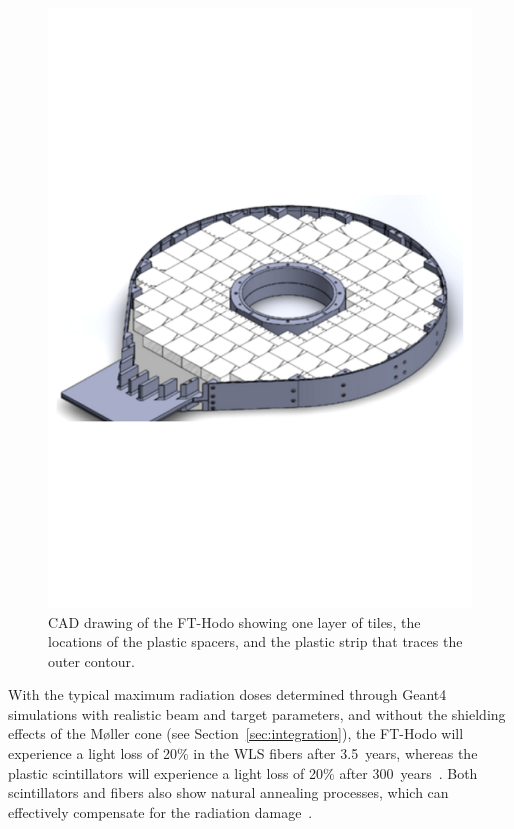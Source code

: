 \begin{figure}[th!]
\centering 
\includegraphics[width=0.85\columnwidth]{./fig/CADFT-Hodo.pdf} 
\caption{CAD drawing of the FT-Hodo showing one layer of tiles, the locations of the plastic spacers, and the plastic
  strip that traces the outer contour. } 
\label{Fig:CADFT-Hodo} 
\end{figure}

With the typical maximum radiation doses determined through Geant4 simulations with realistic beam and target
parameters, and without the shielding effects of the M{\o}ller cone (see Section~\ref{sec:integration}), the
FT-Hodo will experience a light loss of 20\% in the WLS fibers after 3.5~years, whereas the plastic scintillators will
experience a light loss of 20\% after 300~years~\cite{ft-tdr}. Both scintillators and fibers also show natural
annealing processes, which can effectively compensate for the radiation damage~\cite{ft-tdr}.  

